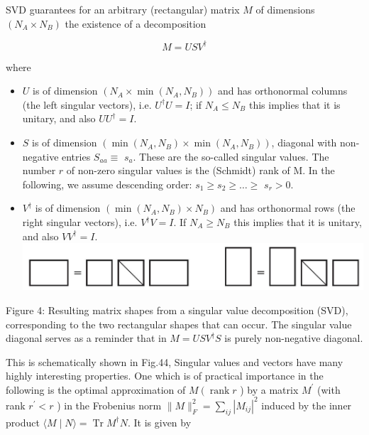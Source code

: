\documentclass[12pt]{article}
\begin{document}
SVD guarantees for an arbitrary (rectangular) matrix $M$ of dimensions $\left(N_{A} \times N_{B}\right)$ the existence of a decomposition


\begin{equation*}
M=U S V^{\dagger} \tag{18}
\end{equation*}


where

\begin{itemize}
  \item $U$ is of dimension $\left(N_{A} \times \min \left(N_{A}, N_{B}\right)\right)$ and has orthonormal columns (the left singular vectors), i.e. $U^{\dagger} U=I$; if $N_{A} \leq N_{B}$ this implies that it is unitary, and also $U U^{\dagger}=I$.
  \item $S$ is of dimension $\left(\min \left(N_{A}, N_{B}\right) \times \min \left(N_{A}, N_{B}\right)\right)$, diagonal with non-negative entries $S_{a a} \equiv$ $s_{a}$. These are the so-called singular values. The number $r$ of non-zero singular values is the (Schmidt) rank of M. In the following, we assume descending order: $s_{1} \geq s_{2} \geq \ldots \geq$ $s_{r}>0$.
  \item $V^{\dagger}$ is of dimension $\left(\min \left(N_{A}, N_{B}\right) \times N_{B}\right)$ and has orthonormal rows (the right singular vectors), i.e. $V^{\dagger} V=I$. If $N_{A} \geq N_{B}$ this implies that it is unitary, and also $V V^{\dagger}=I$.\\
\includegraphics[max width=\textwidth, center]{2024_05_04_afc4ad226da9ccfe0ac8g-016}
\end{itemize}

Figure 4: Resulting matrix shapes from a singular value decomposition (SVD), corresponding to the two rectangular shapes that can occur. The singular value diagonal serves as a reminder that in $M=U S V^{\dagger} S$ is purely non-negative diagonal.

This is schematically shown in Fig.44, Singular values and vectors have many highly interesting properties. One which is of practical importance in the following is the optimal approximation of $M\left(\operatorname{rank} r\right.$ ) by a matrix $M^{\prime}$ (with rank $r^{\prime}<r$ ) in the Frobenius norm $\|M\|_{F}^{2}=\sum_{i j}\left|M_{i j}\right|^{2}$ induced by the inner product $\langle M \mid N\rangle=\operatorname{Tr} M^{\dagger} N$. It is given by
\end{document}
